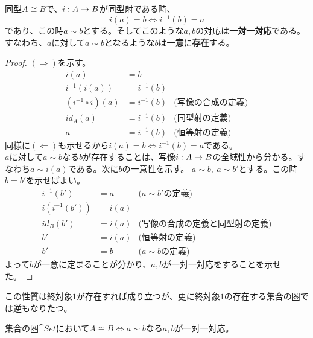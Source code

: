   \begin{prop}[同型と元]\label{prop-isomorphic-and-elements}
    同型$A\cong B$で、$i:A\rightarrow B$が同型射である時、
    \[i(a)=b\iff i^{-1}(b)=a\]であり、この時$a\sim b$とする。そしてこのような$a,b$の対応は\textbf{一対一対応}である。\\
    すなわち、$a$に対して$a\sim b$となるような$b$は\textbf{一意}に\textbf{存在}する。
    \begin{center}
    \end{center} 
  \end{prop}
  \begin{proof}
    $(\Longrightarrow)$を示す。
    \begin{align*}
      i(a)&=b\\
      i^{-1}(i(a))&=i^{-1}(b)\\
      (i^{-1}\circ i)(a)&=i^{-1}(b)&\text{(写像の合成の定義)}\\
      id_A(a)&=i^{-1}(b)&\text{(同型射の定義)}\\
      a &=i^{-1}(b)&\text{(恒等射の定義)}
    \end{align*}
    同様に$(\Longleftarrow)$も示せるから$i(a)=b\iff i^{-1}(b)=a$である。\\
    $a$に対して$a\sim b$なる$b$が存在することは、写像$i:A\rightarrow B$の全域性から分かる。すなわち$a\sim i(a)$である。次に$b$の一意性を示す。
    $a\sim b,\ a\sim b'$とする。この時$b=b'$を示せばよい。
    \begin{align*}
      i^{-1}(b')&=a&\text{($a\sim b'$の定義)}\\
      i(i^{-1}(b'))&=i(a)\\
      id_B(b')&=i(a)&\text{(写像の合成の定義と同型射の定義)}\\
      b'&=i(a)&\text{(恒等射の定義)}\\
      b'&=b&\text{($a\sim b$の定義)}
    \end{align*}
    よって$b$が一意に定まることが分かり、$a,b$が一対一対応をすることを示せた。
  \end{proof}
  この性質は終対象$1$が存在すれば成り立つが、更に終対象$1$の存在する集合の圏では逆もなりたつ。
  \begin{prop}[集合の圏と同型]\label{prop-isomorphic-on-sets}
    集合の圏$\cat{Set}$において$A\cong B\iff a\sim b$なる$a,b$が一対一対応。
  \end{prop}  